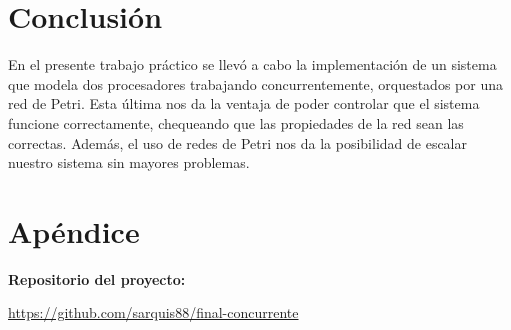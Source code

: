 \documentclass{article}
\begin{document}
    \section{Conclusión}
    En el presente trabajo práctico se llevó a cabo la implementación de un sistema que modela
    dos procesadores trabajando concurrentemente, orquestados por una red de Petri. Esta última
    nos da la ventaja de poder controlar que el sistema funcione correctamente, chequeando que
    las propiedades de la red sean las correctas. Además, el uso de redes de Petri nos da la 
    posibilidad de escalar nuestro sistema sin mayores problemas.
    \newpage 
    \section{Apéndice}
    \textbf{Repositorio del proyecto:} \par  
    \url{https://github.com/sarquis88/final-concurrente}
\end{document}
